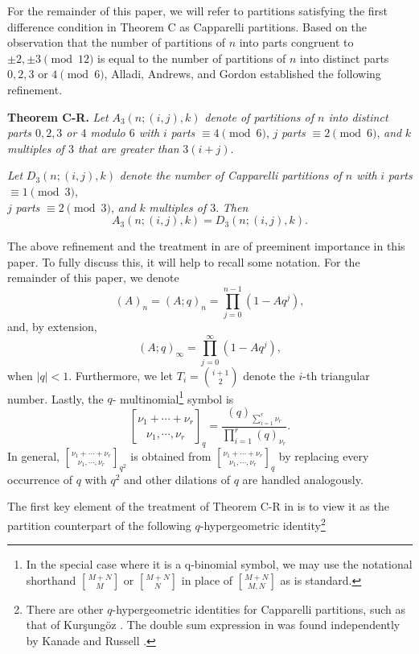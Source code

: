 \documentclass[12pt,a4paper]{amsart}
\theoremstyle{definition}
\theoremstyle{notation}
\theoremstyle{corollary}
\begin{document}
For the remainder of this paper, we will refer to partitions satisfying the first difference condition in Theorem C as Capparelli partitions. Based on the observation that the number of partitions of $n$ into parts congruent to $\pm 2, \pm 3\pmod{12}$ is equal to the number of partitions of $n$ into distinct parts  $0, 2, 3$ or $ 4 \pmod{6}$, Alladi, Andrews, and Gordon \cite{KAGEABG95} established the following refinement.

\medskip

{\bf{Theorem C-R.}} {\it{Let}} $A_3(n;(i,j),k)$ {\it{denote of partitions of $n$ into distinct parts  $0, 2, 3$ or $ 4$ modulo $6$ with}} $i$ {\it{parts}} $\equiv 4 \pmod{6}$, $j$ {\it{parts}}
$\equiv 2\pmod{6}$, {\it{and}} $k$
{\it{multiples of $3$ that are greater than}} $3(i+j)$. 

{\it{Let}} $D_3(n;(i,j),k)$ {\it{denote the number of Capparelli partitions of $n$ with}}
$i$ {\it{parts}} $\equiv 1\pmod{3}$,\\ $j$ {\it{parts}} $\equiv 2\pmod3$, {\it{and}} $k$ {\it{multiples of $3$}}. {\it{Then}}
\[A_3(n;(i,j),k)=D_3(n;(i,j),k).\]

\medskip

The above refinement and the treatment in \cite{KAGEABG95} are of preeminent importance in this paper. To fully discuss this, it will help to recall some notation. For the remainder of this paper, we denote \[
(A)_n=(A;q)_n=\prod^{n-1}_{j=0}(1-Aq^j),\]
and, by extension, \[(A;q)_{\infty}=\prod^{\infty}_{j=0}(1-Aq^j),\] when $|q|<1$.  Furthermore, we let $T_i={i+1 \choose 2}$ denote the $i$-th triangular number. Lastly, the $q$- multinomial\footnote{In the special case where it is a q-binomial symbol, we may use the notational shorthand ${M+N \brack M}$ or ${M+N \brack N}$ in place of ${M+N \brack M,N}$ as is standard.} symbol is
$${{\nu_1+\cdots+\nu_r}\brack {\nu_1, \cdots, \nu_r}}_{q}=\frac{(q)_{\sum_{i=1}^r\nu_r}}{\prod_{i=1}^r(q)_{\nu_r}}.$$
In general, ${{\nu_1+\cdots+\nu_r}\brack {\nu_1, \cdots, \nu_r}}_{q^2}$ is obtained from ${{\nu_1+\cdots+\nu_r}\brack {\nu_1, \cdots, \nu_r}}_{q}$ by replacing every occurrence of $q$ with $q^2$ and other dilations of $q$ are handled analogously.



The first key element of the treatment of Theorem C-R in \cite{KAGEABG95} is to view it as the partition counterpart of the following $q$-hypergeometric identity\footnote{There are other $q$-hypergeometric identities for Capparelli partitions, such as that of Kur\c{s}ung\"{o}z \cite{KK19}. The double sum expression in \cite{KK19} was found independently by Kanade and Russell \cite{KKMCR19}.}
\end{document}
